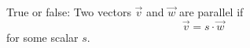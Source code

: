 \documentclass{ximera}
\author{Bart Snapp}
\begin{document}
\begin{exercise}
  True or false: Two vectors $\vec{v}$ and $\vec{w}$ are parallel if 
  \[
  \vec{v} = s\cdot \vec{w}\
  \]
  for some scalar $s$.
  \begin{multipleChoice}
  \end{multipleChoice}
\end{exercise}
\end{document}
